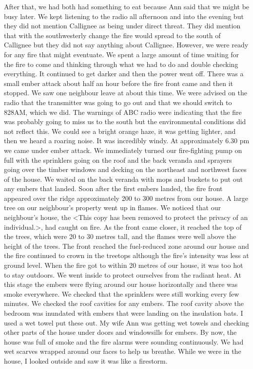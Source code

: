 \documentclass[a4paper]{article}
\begin{document}
        After that, we had both had something to eat because Ann said that we might be busy later.
        We kept listening to the radio all afternoon and into the evening but they did not mention Callignee as being under direct threat. They did mention that with the southwesterly change the fire would spread to the south of Callignee but they did not say anything about Callignee. However, we were ready for any fire that might eventuate. We spent a large amount of time waiting for the fire to come and thinking through what we had to do and double checking everything.
        It continued to get darker and then the power went off. There was a small ember attack about half an hour before the fire front came and then it stopped. We saw one neighbour leave at about this time. We were advised on the radio that the transmitter was going to go out and that we should switch to 828AM, which we did.
        The warnings of ABC radio were indicating that the fire was probably going to miss us to the south but the environmental conditions did not reflect this. We could see a bright orange haze, it was getting lighter, and then we heard a roaring noise. It was incredibly windy.
        At approximately 6.30 pm we came under ember attack. We immediately turned our fire-fighting pump on full with the sprinklers going on the roof and the back veranda and sprayers going over the timber windows and decking on the northeast and northwest faces of the house. We waited on the back veranda with mops and buckets to put out any embers that landed.
        Soon after the first embers landed, the fire front appeared over the ridge approximately 200 to 300 metres from our house. A large tree on our neighbour's property went up in flames. We noticed that our neighbour's house, the <This copy has been removed to protect the privacy of an individual.>, had caught on fire.
        As the front came closer, it reached the top of the trees, which were 20 to 30 metres tall, and the flames were well above the height of the trees. The front reached the fuel-reduced zone around our house and the fire continued to crown in the treetops although the fire's intensity was less at ground level.
        When the fire got to within 20 metres of our house, it was too hot to stay outdoors. We went inside to protect ourselves from the radiant heat. At this stage the embers were flying around our house horizontally and there was smoke everywhere.
        We checked that the sprinklers were still working every few minutes. We checked the roof cavities for any embers. The roof cavity above the bedroom was inundated with embers that were landing on the insulation bats. I used a wet towel put these out. My wife Ann was getting wet towels and checking other parts of the house under doors and windowsills for embers. By now, the house was full of smoke and the fire alarms were sounding continuously. We had wet scarves wrapped around our faces to help us breathe. While we were in the house, I looked outside and saw it was like a firestorm.
\end{document}
